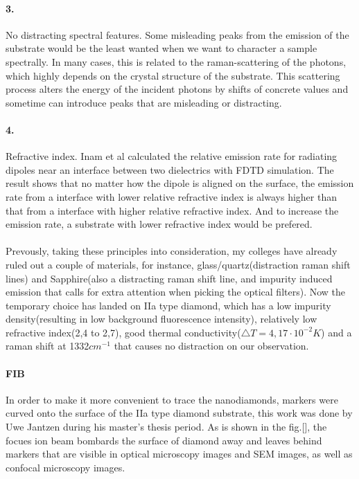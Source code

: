 \paragraph{3.} No distracting spectral features.
Some misleading peaks from the emission of the substrate would be the least wanted when we want to character a sample spectrally. In many cases, this is related to the raman-scattering of the photons, which highly depends on the crystal structure of the substrate. This scattering process alters the energy of the incident photons by shifts of concrete values and sometime can introduce peaks that are misleading or distracting.
\paragraph{4.}Refractive index. Inam et al calculated the relative emission rate for radiating dipoles near an interface between two dielectrics with FDTD simulation. The result shows that no matter how the dipole is aligned on the surface, the emission rate from a interface with lower relative refractive index is always higher than that from a interface with higher relative refractive index. And to increase the emission rate, a substrate with lower refractive index would be prefered.
\paragraph{}Prevously, taking these principles into consideration, my colleges have already ruled out a couple of materials, for instance, glass/quartz(distraction raman shift lines) and Sapphire(also a distracting raman shift line, and impurity induced emission that calls for extra attention when picking the optical filters). Now the temporary choice has landed on IIa type diamond, which has a low impurity density(resulting in low background fluorescence intensity), relatively low refractive index(2,4 to 2,7), good thermal conductivity($\bigtriangleup T = 4,17 \cdot 10^{-2}K$) and a raman shift at 1332$cm^{-1} $ that causes no distraction on our observation.

\paragraph{FIB}
In order to make it more convenient to trace the nanodiamonds, markers were curved onto the surface of the IIa type diamond substrate, this work was done by Uwe Jantzen during his master's thesis period. As is shown in the fig.[], the focues ion beam bombards the surface of diamond away and leaves behind markers that are visible in optical microscopy images and SEM images, as well as confocal microscopy images.
